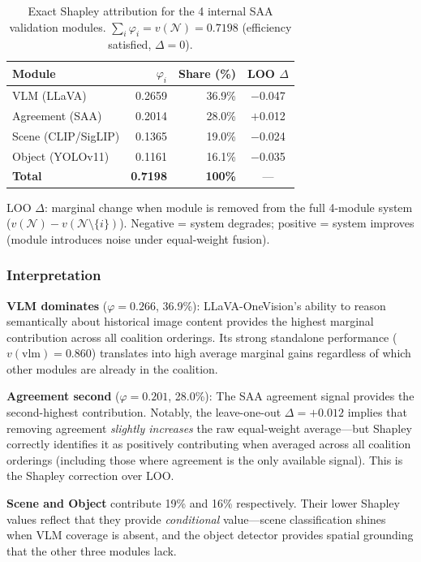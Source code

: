 \documentclass[12pt,onecolumn,a4paper]{IEEEtran}
\begin{document}
\begin{table}[!htbp]
\centering
\caption{Exact Shapley attribution for the 4 internal SAA validation modules. $\sum_i \varphi_i = v(\mathcal{N}) = 0.7198$ (efficiency satisfied, $\Delta = 0$).}
\label{tab:shapley_values}
\begin{tabular}{lrrc}
\toprule
Module & $\varphi_i$ & Share (\%) & LOO $\Delta$ \\
\midrule
VLM (LLaVA) & 0.2659 & 36.9\% & $-$0.047 \\
Agreement (SAA) & 0.2014 & 28.0\% & $+$0.012 \\
Scene (CLIP/SigLIP) & 0.1365 & 19.0\% & $-$0.024 \\
Object (YOLOv11) & 0.1161 & 16.1\% & $-$0.035 \\
\midrule
\textbf{Total} & \textbf{0.7198} & \textbf{100\%} & --- \\
\bottomrule
\end{tabular}
\begin{flushleft}
\small{LOO $\Delta$: marginal change when module is removed from the full 4-module system ($v(\mathcal{N}) - v(\mathcal{N} \setminus \{i\})$). Negative = system degrades; positive = system improves (module introduces noise under equal-weight fusion).}
\end{flushleft}
\end{table}

\subsubsection{Interpretation}

\textbf{VLM dominates} ($\varphi = 0.266$, 36.9\%): LLaVA-OneVision's ability to reason semantically about historical image content provides the highest marginal contribution across all coalition orderings. Its strong standalone performance ($v(\text{vlm}) = 0.860$) translates into high average marginal gains regardless of which other modules are already in the coalition.

\textbf{Agreement second} ($\varphi = 0.201$, 28.0\%): The SAA agreement signal provides the second-highest contribution. Notably, the leave-one-out $\Delta = +0.012$ implies that removing agreement \textit{slightly increases} the raw equal-weight average---but Shapley correctly identifies it as positively contributing when averaged across all coalition orderings (including those where agreement is the only available signal). This is the Shapley correction over LOO.

\textbf{Scene and Object} contribute 19\% and 16\% respectively. Their lower Shapley values reflect that they provide \textit{conditional} value---scene classification shines when VLM coverage is absent, and the object detector provides spatial grounding that the other three modules lack.
\end{document}

